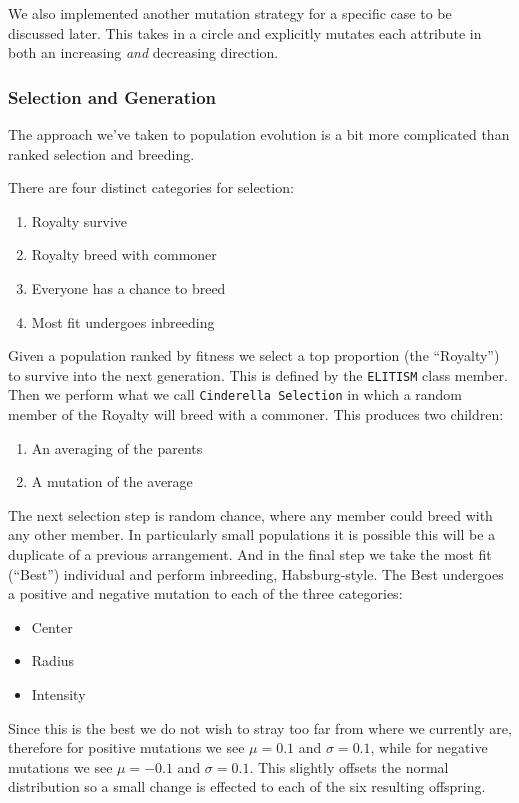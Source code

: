 \documentclass[12pt]{article}
\begin{document}
We also implemented another mutation strategy for a specific case to be discussed later. This takes in a circle and explicitly mutates each attribute in both an increasing \textit{and} decreasing direction.

\subsubsection{Selection and Generation}
The approach we've taken to population evolution is a bit more complicated than ranked selection and breeding. 

There are four distinct categories for selection:
\begin{enumerate}
    \item Royalty survive
    \item Royalty breed with commoner
    \item Everyone has a chance to breed
    \item Most fit undergoes inbreeding
\end{enumerate}

Given a population ranked by fitness we select a top proportion (the ``Royalty'') to survive into the next generation. This is defined by the \texttt{ELITISM} class member. Then we perform what we call \texttt{Cinderella Selection} in which a random member of the Royalty will breed with a commoner. This produces two children:
\begin{enumerate}
    \item An averaging of the parents
    \item A mutation of the average
\end{enumerate}

The next selection step is random chance, where any member could breed with any other member. In particularly small populations it is possible this will be a duplicate of a previous arrangement. And in the final step we take the most fit (``Best'') individual and perform inbreeding, Habsburg-style. The Best undergoes a positive and negative mutation to each of the three categories:
\begin{itemize}
    \item Center
    \item Radius
    \item Intensity
\end{itemize}

Since this is the best we do not wish to stray too far from where we currently are, therefore for positive mutations we see $\mu = 0.1$ and $\sigma = 0.1$, while for negative mutations we see $\mu = -0.1$ and $\sigma = 0.1$. This slightly offsets the normal distribution so a small change is effected to each of the six resulting offspring.
\end{document}
